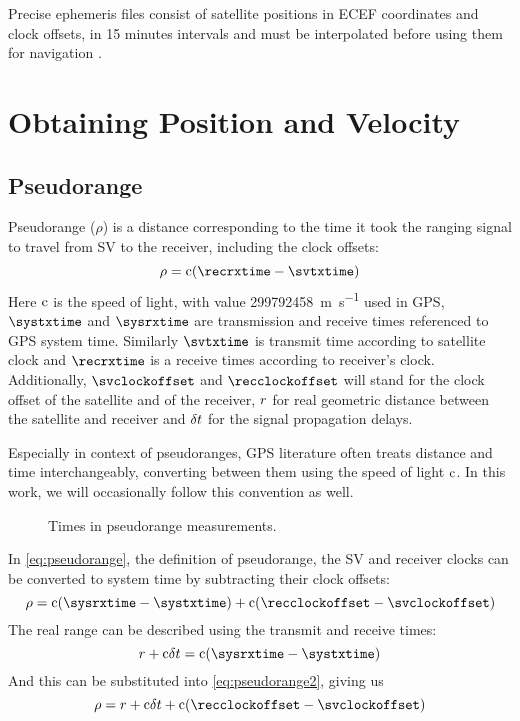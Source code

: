 Precise ephemeris files consist of satellite positions in ECEF
coordinates and clock offsets, in 15 minutes intervals and must be interpolated
before using them for navigation \cite{schenewerk03}.

\section{Obtaining Position and Velocity}


\subsection{Pseudorange}
\label{sec:pseudorange}

Pseudorange (\(\rho\)) is a distance corresponding to the time it took the ranging
signal to travel from SV to the receiver, including the clock offsets:
\begin{equation}
	\label{eq:pseudorange}
	\rho = \speedoflight (\recrxtime - \svtxtime)
\end{equation}
Here \(\mathrm{c}\) is the speed of light, with value \SI{299792458}{\meter\per\second} used in GPS,
\(\systxtime\) and \(\sysrxtime\) are transmission and receive times referenced to GPS system time.
Similarly \(\svtxtime\) is transmit time according to satellite clock and
\(\recrxtime\) is a receive times according to receiver's clock.
Additionally, \(\svclockoffset\) and \(\recclockoffset\) will stand for the clock offset of the satellite
and of the receiver, \(r\) for real geometric distance between the satellite and receiver
and \(\delta{t}\) for the signal propagation delays.

Especially in context of pseudoranges, GPS literature often treats distance and time
interchangeably, converting between them using the speed of light \(\mathrm{c}\).
In this work, we will occasionally follow this convention as well.

\begin{figure}[tb]
	\centering
	
	\caption{Times in pseudorange measurements.}
	\label{fig:pseudorange}
\end{figure}

In \eqref{eq:pseudorange}, the definition of pseudorange, the SV and receiver clocks can be
converted to system time by subtracting their clock offsets:
\begin{equation}
	\label{eq:pseudorange2}
	\rho = \speedoflight (\sysrxtime - \systxtime) + \speedoflight (\recclockoffset - \svclockoffset)
\end{equation}
The real range can be described using the transmit and receive times:
\begin{equation}
	\geomrange + \speedoflight\geomrangedelays = \speedoflight (\sysrxtime - \systxtime)
\end{equation}
And this can be substituted into \eqref{eq:pseudorange2}, giving us
\begin{equation}
	\rho = \geomrange + \speedoflight\geomrangedelays + \speedoflight (\recclockoffset - \svclockoffset)
\end{equation}

